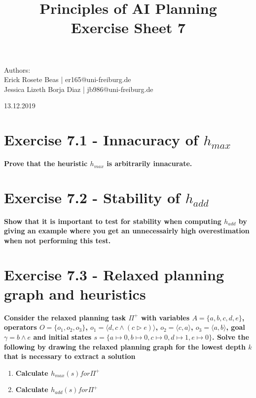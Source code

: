 \documentclass[12pt,a4paper]{article}
\title{\textbf{Principles of AI Planning
		\\{\Large Exercise Sheet 7}}}
\begin{document}
\begin{flushleft}
	Authors:\\
	Erick Rosete Beas | er165@uni-freiburg.de\\
	Jessica Lizeth Borja Diaz | jb986@uni-freiburg.de\\
\end{flushleft}
{\let\newpage\relax\maketitle}
\begin{center} 
	\large 13.12.2019 
\end{center}

\section*{Exercise 7.1 - Innacuracy of $h_{max}$}
\textbf{Prove that the heuristic $h_{max}$ is arbitrarily innacurate.}\\

\section*{Exercise 7.2 - Stability of $h_{add}$ }
\textbf{Show that it is important to test for stability when computing $h_{add}$
by giving an example where you get an unnecessairly high overestimation
when not performing this test.}\\

\section*{Exercise 7.3 - Relaxed planning graph and heuristics}
\textbf{Consider the relaxed planning task $\Pi^+$ with variables 
$A=\{a,b,c,d,e\}$, operators $O=\{o_1,o_2,o_3\}$, $o_1=\langle d, c \land (c \triangleright e)\rangle$,
$o_2= \langle c , a \rangle$, $o_3= \langle a, b\rangle$, goal
$\gamma = b \land e$ and initial states $s=\{ a\mapsto 0, 
b\mapsto 0, c \mapsto 0, d \mapsto 1, e \mapsto 0 \}$. Solve the following
by drawing the relaxed planning graph for the lowest depth $k$
that is necessary to extract a solution}
\begin{enumerate}[label=(\alph*), listparindent=1.5em]
	\item \textbf{Calculate $h_{max}(s) for \Pi^+ $}
	\item \textbf{Calculate $h_{add}(s) for \Pi^+ $}
\end{enumerate}
\end{document}

